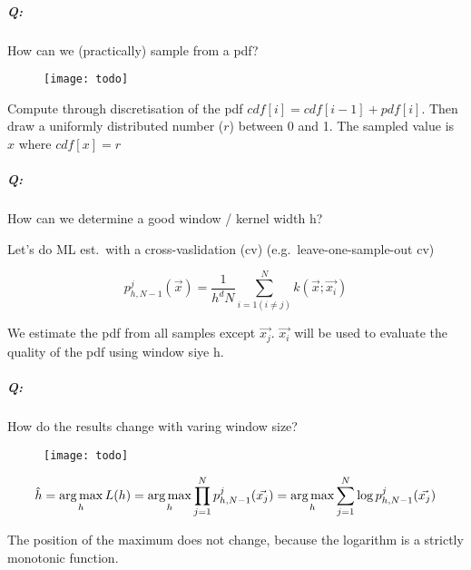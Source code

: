 \subparagraph{Q:} How can we (practically) sample from a pdf?

\begin{figure}[H]
  \centering
  \texttt{[image: todo]}
\end{figure}

Compute through discretisation of the pdf $cdf[i] = cdf[i-1] + pdf[i]$. Then draw a uniformly distributed number ($r$) between 0 and 1. The sampled value is $x$ where $cdf[x] = r$


\subparagraph{Q:} How can we determine a good window / kernel width h?

Let's do ML est.\ with a cross-vaslidation (cv) (e.g.\ leave-one-sample-out cv)

\begin{equation*}
  p_{h,N-1}^j(\vec{x}) = \dfrac{1}{h^d N} \sum_{i=1 (i \neq j)}^N k(\vec{x}; \vec{x_i})
\end{equation*}

We estimate the pdf from all samples except $\vec{x_j}$. $\vec{x_i}$ will be used to evaluate the quality of the pdf using window siye h.

\subparagraph{Q:} How do the results change with varing window size?

\begin{figure}[H]
  \centering
  \texttt{[image: todo]}
\end{figure}

\begin{equation*}
\hat{h} = \operatorname*{arg\,max}_h L(h) = \operatorname*{arg\,max}_h \prod_{j=1}^N p_{h,N-1}^j(\vec{x_j}) = \operatorname*{arg\,max}_h \sum_{j=1}^N \log p_{h,N-1}^j(\vec{x_j})
\end{equation*}

The position of the maximum does not change, because the logarithm is a strictly monotonic function.
